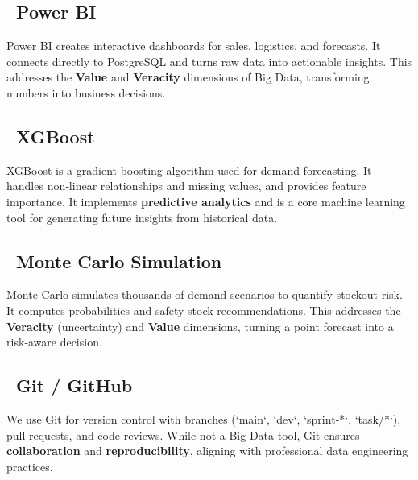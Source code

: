 \documentclass[12pt, a4paper]{report}
\begin{document}
\subsection*{\faChartLine\ Power BI}
Power BI creates interactive dashboards for sales, logistics, and forecasts. It connects directly to PostgreSQL and turns raw data into actionable insights. This addresses the \textbf{Value} and \textbf{Veracity} dimensions of Big Data, transforming numbers into business decisions.

\subsection*{\faRobot\ XGBoost}
XGBoost is a gradient boosting algorithm used for demand forecasting. It handles non‑linear relationships and missing values, and provides feature importance. It implements \textbf{predictive analytics} and is a core machine learning tool for generating future insights from historical data.

\subsection*{\faRandom\ Monte Carlo Simulation}
Monte Carlo simulates thousands of demand scenarios to quantify stockout risk. It computes probabilities and safety stock recommendations. This addresses the \textbf{Veracity} (uncertainty) and \textbf{Value} dimensions, turning a point forecast into a risk‑aware decision.

\subsection*{\faGithub\ Git / GitHub}
We use Git for version control with branches (`main`, `dev`, `sprint‑*`, `task/*`), pull requests, and code reviews. While not a Big Data tool, Git ensures \textbf{collaboration} and \textbf{reproducibility}, aligning with professional data engineering practices.
\end{document}
